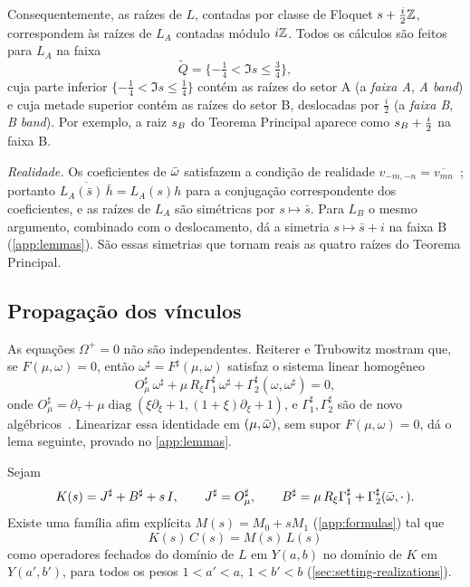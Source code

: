 Consequentemente, as raízes de $L$, contadas por classe de Floquet $s+\tfrac{i}{2}\mathbb{Z}$, correspondem às raízes de
$L_A$ contadas módulo $i\mathbb{Z}$. Todos os cálculos são feitos para $L_A$ na faixa
\[
  \widetilde Q=\{-\tfrac14<\Im s\le\tfrac34\},
\]
cuja parte inferior $\{-\tfrac14<\Im s\le\tfrac14\}$ contém as raízes do setor A (a \emph{faixa A}, \emph{A band}) e cuja metade
superior contém as raízes do setor B, deslocadas por $\tfrac i2$ (a \emph{faixa B}, \emph{B band}). Por exemplo, a raiz $s_{B}$
do Teorema Principal aparece como $s_{B}+\tfrac i2$ na faixa B.

\emph{Realidade.} Os coeficientes de $\bar\omega$ satisfazem a condição de realidade
$v_{-m,-n}=\overline{v_{mn}}$~\cite{RT2019}; portanto $\overline{L_A(\bar s)\,\bar h}=L_A(s)h$ para a
conjugação correspondente dos coeficientes, e as raízes de $L_A$ são simétricas por $s\mapsto\bar s$.
Para $L_B$ o mesmo argumento, combinado com o deslocamento, dá a simetria $s\mapsto\bar s+i$ na faixa B
(\cref{app:lemmas}). São essas simetrias que tornam reais as quatro raízes do Teorema Principal.

\subsection{Propagação dos vínculos}\label{sec:setting-constraints}

As equações $\Omega^+=0$ não são independentes. Reiterer e Trubowitz mostram que, se $F(\mu,\omega)=0$,
então $\omega^\sharp=F^\sharp(\mu,\omega)$ satisfaz o sistema linear homogêneo
\begin{equation}\label{eq:sharp}
  O_\mu^\sharp\,\omega^\sharp+\mu\,R_\xi\Gamma_1^\sharp\,\omega^\sharp+\Gamma_2^\sharp(\omega,\omega^\sharp)=0,
\end{equation}
onde $O_\mu^\sharp=\partial_\tau+\mu\operatorname{diag}(\xi\partial_\xi+1,(1+\xi)\partial_\xi+1)$, e
$\Gamma^\sharp_1,\Gamma^\sharp_2$ são de novo algébricos~\cite[\S3]{RT2019}. Linearizar essa identidade em
$(\mu,\bar\omega)$, sem supor $F(\mu,\omega)=0$, dá o lema seguinte, provado no
\cref{app:lemmas}.

\begin{lemma}\label{lem:KCML}
Sejam
\[
  K(s)=J^\sharp+B^\sharp+s\,I,\qquad J^\sharp=O^\sharp_\mu,\qquad
  B^\sharp=\mu\,R_\xi\Gamma_1^\sharp+\Gamma_2^\sharp(\bar\omega,\cdot\,).
\]
Existe uma família afim explícita $M(s)=M_0+sM_1$ (\cref{app:formulas}) tal que
\begin{equation}\label{eq:KCML}
  K(s)\,C(s)=M(s)\,L(s)
\end{equation}
como operadores fechados do domínio de $L$ em $Y(a,b)$ no domínio de $K$ em $Y(a',b')$, para todos os pesos
$1<a'<a$, $1<b'<b$ (\cref{sec:setting-realizations}).
\end{lemma}


